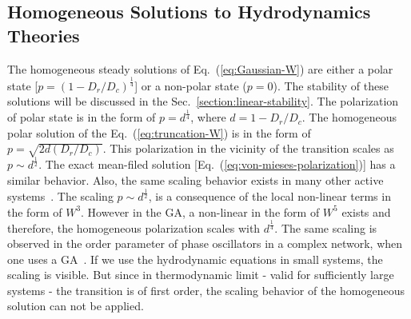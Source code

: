 \documentclass[reprint,floatfix,amsmath,amssymb,aps,pre,showkeys,showpacs,superscriptaddress]{revtex4-1}
\newcommand{\p}{p}
\newcommand{\w}{W}
\newcommand{\hl}[1]{\textcolor{hlcolor}{#1}}
\newcommand{\req}[1]{Eq.~(\ref{#1})}
\begin{document}
\subsection{Homogeneous Solutions to Hydrodynamics Theories}
\label{subsec:homogeneous}

\hl{
The homogeneous steady solutions of \req{eq:Gaussian-W} are either a polar state [$\p = (1 - D_r / D_c)^\frac{1}{4}$] or a non-polar state ($\p = 0$). The stability of these solutions will be discussed in the Sec.~\ref{section:linear-stability}. The polarization of polar state is in the form of $\p = d^\frac{1}{4}$, where $d = 1 - D_r/D_c$. The homogeneous polar solution of the \req{eq:truncation-W} is in the form of $\p=\sqrt{ 2 d (D_r / D_c)}$. This polarization in the vicinity of the transition scales as $\p \sim d^{\frac{1}{2}}$. The exact mean-filed solution [\req{eq:von-mieses-polarization}] has a similar behavior. Also, the same scaling behavior exists in many other active systems~\cite{Toner1995,Bertin2006,Bertin2009,Farrell2012,Bertin2006,Bertin2009,peruani2008mean}. The scaling $\p \sim d^{\frac{1}{2}}$, is a consequence of the local non-linear terms in the form of $\w^3$. However in the GA, a non-linear in the form of $\w^5$ exists and therefore, the homogeneous polarization scales with $d^{\frac{1}{4}}$. The same scaling is observed in the order parameter of phase oscillators in a complex network, when one uses a GA~\cite{sonnenschein2013approximate,sonnenschein2013excitable,sonnenschein2014cooperative,Sonnenschein2015}. If we use the hydrodynamic equations in small systems, the scaling is visible. But since in thermodynamic limit - valid for sufficiently large systems - the transition is of first order, the scaling behavior of the homogeneous solution can not be applied.
}
\end{document}
